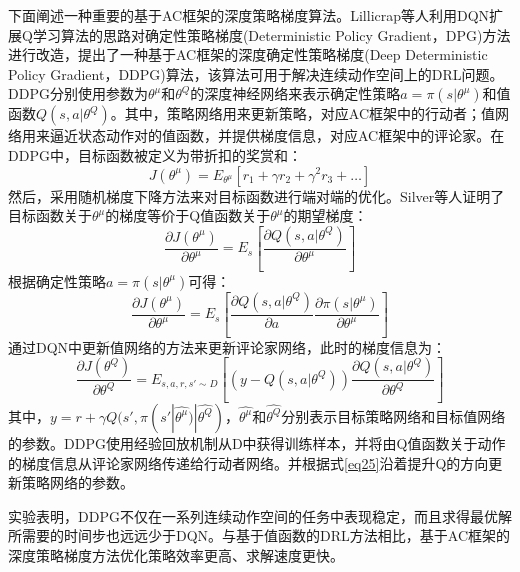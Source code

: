 \documentclass[bachelor]{thesis-uestc}
\begin{document}
	下面阐述一种重要的基于AC框架的深度策略梯度算法。Lillicrap等人\cite{lillicrap2015continuous}利用DQN扩展Q学习算法的思路对确定性策略梯度(Deterministic Policy Gradient，DPG)方法进行改造，提出了一种基于AC框架的深度确定性策略梯度(Deep Deterministic Policy Gradient，DDPG)算法，该算法可用于解决连续动作空间上的DRL问题。DDPG分别使用参数为$\theta^\mu$和$\theta^Q$的深度神经网络来表示确定性策略$a=\pi(s|\theta^\mu)$和值函数$Q(s,a|\theta^Q)$。其中，策略网络用来更新策略，对应AC框架中的行动者；值网络用来逼近状态动作对的值函数，并提供梯度信息，对应AC框架中的评论家。在DDPG中，目标函数被定义为带折扣的奖赏和：
	\begin{equation}
		\label{eq23}
		J(\theta^\mu)=E_{\theta^\mu}[r_1+\gamma r_2+\gamma^2r_3+\dots]
	\end{equation}
	然后，采用随机梯度下降方法来对目标函数进行端对端的优化。Silver等人\cite{silver2014deterministic}证明了目标函数关于$\theta^\mu$的梯度等价于Q值函数关于$\theta^\mu$的期望梯度：
	\begin{equation}
		\label{eq24}
		\frac{\partial J(\theta^\mu)}{\partial \theta^\mu}=E_s[\frac{\partial Q(s,a|\theta^Q)}{\partial \theta^\mu}]
	\end{equation}
	根据确定性策略$a=\pi(s|\theta^\mu)$可得：
	\begin{equation}
		\label{eq25}
		\frac{\partial J(\theta^\mu)}{\partial \theta^\mu}=E_s[\frac{\partial Q(s,a|\theta^Q)}{\partial a}\frac{\partial \pi(s|\theta^\mu)}{\partial \theta^\mu}]
	\end{equation}
	通过DQN中更新值网络的方法来更新评论家网络，此时的梯度信息为：
	\begin{equation}
		\label{eq26}
		\frac{\partial J(\theta^Q)}{\partial \theta^Q}=E_{s,a,r,s'\sim D}[(y-Q(s,a|\theta^Q))\frac{\partial Q(s,a|\theta^Q)}{\partial \theta^Q}]
	\end{equation}
	其中，$y=r+\gamma Q(s',\pi(s'|\hat{\theta ^\mu})|\hat{\theta ^Q})$，$\hat{\theta ^\mu}$和$\hat{\theta ^Q}$分别表示目标策略网络和目标值网络的参数。DDPG使用经验回放机制从D中获得训练样本，并将由Q值函数关于动作的梯度信息从评论家网络传递给行动者网络。并根据式\ref{eq25}沿着提升Q的方向更新策略网络的参数。
	
	实验表明，DDPG不仅在一系列连续动作空间的任务中表现稳定，而且求得最优解所需要的时间步也远远少于DQN。与基于值函数的DRL方法相比，基于AC框架的深度策略梯度方法优化策略效率更高、求解速度更快。
	
\end{document}
